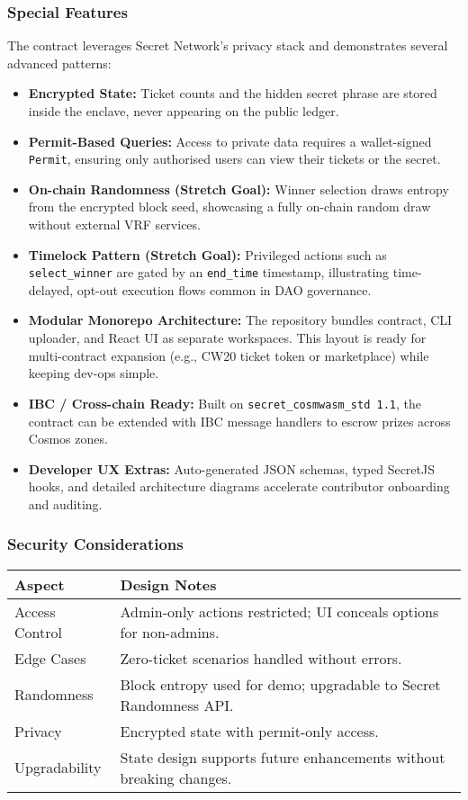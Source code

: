 \documentclass{article}
\begin{document}
\subsubsection{Special Features}
The contract leverages Secret Network's privacy stack and demonstrates several advanced patterns:
\begin{itemize}
  \item \textbf{Encrypted State:} Ticket counts and the hidden secret phrase are stored inside the enclave, never appearing on the public ledger.
  \item \textbf{Permit-Based Queries:} Access to private data requires a wallet-signed \texttt{Permit}, ensuring only authorised users can view their tickets or the secret.
  \item \textbf{On-chain Randomness (Stretch Goal):} Winner selection draws entropy from the encrypted block seed, showcasing a fully on-chain random draw without external VRF services.
  \item \textbf{Timelock Pattern (Stretch Goal):} Privileged actions such as \texttt{select\_winner} are gated by an \texttt{end\_time} timestamp, illustrating time-delayed, opt-out execution flows common in DAO governance.
  \item \textbf{Modular Monorepo Architecture:} The repository bundles contract, CLI uploader, and React UI as separate workspaces. This layout is ready for multi-contract expansion (e.g., CW20 ticket token or marketplace) while keeping dev-ops simple.
  \item \textbf{IBC / Cross-chain Ready:} Built on \texttt{secret\_cosmwasm\_std~1.1}, the contract can be extended with IBC message handlers to escrow prizes across Cosmos zones.
  \item \textbf{Developer UX Extras:} Auto-generated JSON schemas, typed SecretJS hooks, and detailed architecture diagrams accelerate contributor onboarding and auditing.
\end{itemize}

\subsubsection{Security Considerations}
\begin{center}
\begin{tabular}{@{}lp{10cm}@{}}
\toprule
Aspect & Design Notes \\
\midrule
Access Control & Admin-only actions restricted; UI conceals options for non-admins. \\
Edge Cases & Zero-ticket scenarios handled without errors. \\
Randomness & Block entropy used for demo; upgradable to Secret Randomness API. \\
Privacy & Encrypted state with permit-only access. \\
Upgradability & State design supports future enhancements without breaking changes. \\
\bottomrule
\end{tabular}
\end{center}
\end{document}
